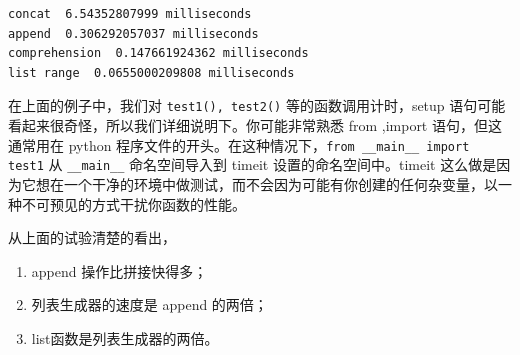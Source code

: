 \begin{frame}[fragile]\ft{\subsecname}

\begin{lstlisting}[frame=no]
concat  6.54352807999 milliseconds
append  0.306292057037 milliseconds
comprehension  0.147661924362 milliseconds
list range  0.0655000209808 milliseconds
\end{lstlisting}

\end{frame}

\begin{frame}[fragile]\ft{\subsecname}

在上面的例子中，我们对 \lstinline|test1(), test2()| 等的函数调用计时，setup 语句可能看起来很奇怪，所以我们详细说明下。你可能非常熟悉 from ,import 语句，但这通常用在 python 程序文件的开头。在这种情况下，\lstinline|from __main__ import test1| 从 \lstinline|__main__| 命名空间导入到 timeit 设置的命名空间中。timeit 这么做是因为它想在一个干净的环境中做测试，而不会因为可能有你创建的任何杂变量，以一种不可预见的方式干扰你函数的性能。

\end{frame}

\begin{frame}[fragile]\ft{\subsecname}

从上面的试验清楚的看出，
\begin{enumerate}
	\item append 操作比拼接快得多；
	\item 列表生成器的速度是 append 的两倍；
	\item list函数是列表生成器的两倍。
\end{enumerate}
\end{frame}


